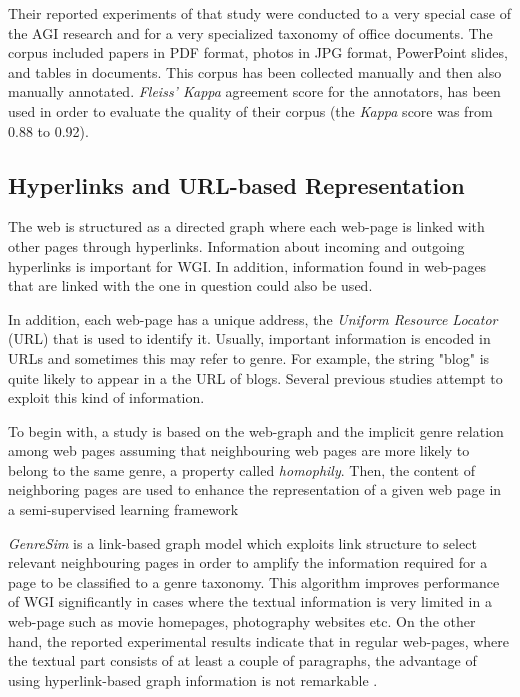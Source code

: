 Their reported experiments of that study were conducted to a very special case of  the AGI research and for a very specialized taxonomy of office documents. The corpus included papers in PDF format, photos in JPG format, PowerPoint slides, and tables in documents. This corpus has been collected manually and then also manually annotated. \textit{Fleiss' Kappa} agreement score for the annotators, has been used in order to evaluate the quality of their corpus (the \textit{Kappa} score was from 0.88 to 0.92).

\subsection{Hyperlinks and URL-based Representation}
\label{chap:relevant_work:sec:url}

The web is structured as a directed graph where each web-page is linked with other pages through hyperlinks. Information about incoming and outgoing hyperlinks is important for WGI. In addition, information found in web-pages that are linked with the one in question could also be used.

In addition, each web-page has a unique address, the \textit{Uniform Resource Locator} (URL) that is used to identify it. Usually, important information is encoded in URLs and sometimes this may refer to genre. For example, the string "blog" is quite likely to appear in a the URL of blogs. Several previous studies attempt to exploit this kind of information.

To begin with, a study is based on the web-graph and the implicit genre relation among web pages assuming that neighbouring web pages are more likely to belong to the same genre, a property called \textit{homophily}. Then, the content of neighboring pages are used to enhance the representation of a given web page in a semi-supervised learning framework \parencite{asheghi2014semi} %

\textit{GenreSim} is a link-based graph model which exploits link structure to select relevant neighbouring pages in order to amplify the information required for a page to be classified to a genre taxonomy. This algorithm improves performance of WGI significantly in cases where the textual information is very limited in a web-page such as movie homepages, photography websites etc. On the other hand, the reported experimental results indicate that in regular web-pages, where the textual part consists of at least a couple of paragraphs, the advantage of using hyperlink-based graph information is not remarkable \parencite{zhu2011enhance,zhu2016exploiting}.

